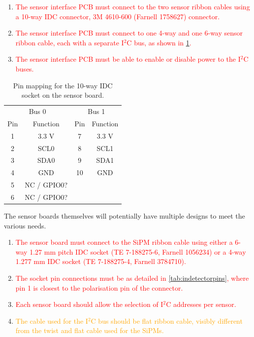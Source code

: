 \documentclass[a4paper]{article}
\newcommand{\must}[1]{\textcolor{red}{#1}}
\newcommand{\should}[1]{\textcolor{orange}{#1}}
\def\I2C{I$^2$C}
\begin{document}
\begin{enumerate}
    \item \must{The sensor interface PCB must connect to the two sensor ribbon cables using a 10-way IDC connector, 3M 4610-600 (Farnell 1758627) connector.}
    \item \must{The sensor interface PCB must connect to one 4-way and one 6-way sensor ribbon cable, each with a separate \I2C bus, as shown in \cref{tab:i2cbus}.}
    \item \must{The sensor interface PCB must be able to enable or disable power to the \I2C buses.}
\end{enumerate}

\begin{table}[h]
    \begin{center}
        \caption{Pin mapping for the 10-way IDC socket on the sensor board.}
        \label{tab:i2cbus}
        \begin{tabular}{cc|cc}
            \hline
            \hline
            \multicolumn{2}{c}{Bus 0} & \multicolumn{2}{c}{Bus 1}\\
            Pin & Function & Pin & Function \\
            \hline
            1 & 3.3 V & 7 & 3.3 V \\
            2 & SCL0 & 8 & SCL1 \\
            3 & SDA0 & 9 & SDA1 \\
            4 & GND & 10 & GND \\
            5 & NC / GPIO0? & & \\
            6 & NC / GPIO0? & & \\
            \hline
            \hline
        \end{tabular}
    \end{center}
\end{table}

The sensor boards themselves will potentially have multiple designs to meet the various needs.

\begin{enumerate}
    \item \must{The sensor board must connect to the SiPM ribbon cable using either a 6-way 1.27 mm pitch IDC socket (TE 7-188275-6, Farnell 1056234) or a 4-way 1.277 mm IDC socket (TE 7-188275-4, Farnell 3784710).}
    \item \must{The socket pin connections must be as detailed in \cref{tab:indetectorpins}, where pin 1 is closest to the polarisation pin of the connector.}
    \item \must{Each sensor board should allow the selection of \I2C addresses per sensor.}
    \item \should{The cable used for the \I2C bus should be flat ribbon cable, visibly different from the twist and flat cable used for the SiPMs.}
\end{enumerate}
\end{document}
